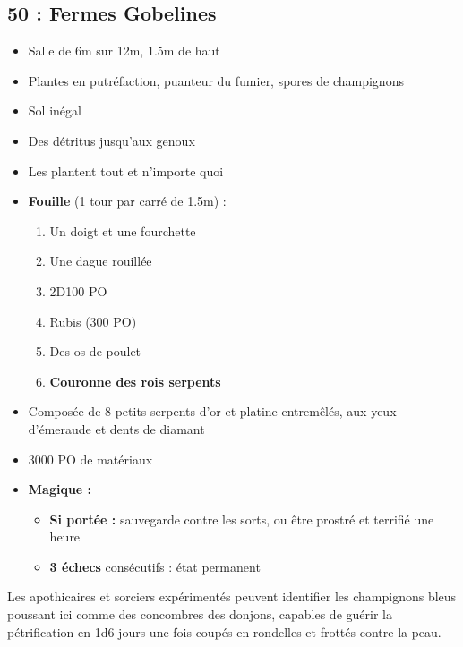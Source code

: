 \subsection{50 : Fermes Gobelines}\label{n3:s50}
\begin{itemize}
  \item Salle de 6m sur 12m, 1.5m de haut 
  \item Plantes en putréfaction, puanteur du fumier, spores de champignons
  \item Sol inégal
  \item Des détritus jusqu’aux genoux
  \item Les \textbf{} plantent tout et n'importe quoi
  \item \textbf{Fouille} (1 tour par carré de 1.5m) :
  \begin{enumerate}
    \item Un doigt et une fourchette
    \item Une dague rouillée
    \item 2D100 PO
    \item Rubis (300 PO)
    \item Des os de poulet
    \item \textbf{Couronne des rois serpents} 
  \end{enumerate}
\end{itemize}

\begin{highlight}
\begin{itemize}
  \item Composée de 8 petits serpents d’or et platine entremêlés, aux yeux d’émeraude et dents de diamant
  \item 3000 PO de matériaux
  \item \textbf{Magique :}
  \begin{itemize}
    \item \textbf{Si portée :} sauvegarde contre les sorts, ou être prostré et terrifié une heure
    \item \textbf{3 échecs} consécutifs : état permanent
  \end{itemize}
\end{itemize}
\end{highlight}

Les apothicaires et sorciers expérimentés peuvent identifier les champignons bleus poussant ici comme des concombres des donjons, capables de guérir la pétrification en 1d6 jours une fois coupés en rondelles et frottés contre la peau.




